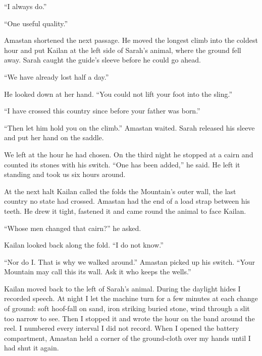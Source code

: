 ``I always do.''\par

``One useful quality.''\par

Amastan shortened the next passage. He moved the longest climb into the coldest hour and put Kailan at the left side of Sarah's animal, where the ground fell away. Sarah caught the guide's sleeve before he could go ahead.\par

``We have already lost half a day.''\par

He looked down at her hand. ``You could not lift your foot into the sling.''\par

``I have crossed this country since before your father was born.''\par

``Then let him hold you on the climb.'' Amastan waited. Sarah released his sleeve and put her hand on the saddle.\par

We left at the hour he had chosen. On the third night he stopped at a cairn and counted its stones with his switch. ``One has been added,'' he said. He left it standing and took us six hours around.\par

At the next halt Kailan called the folds the Mountain's outer wall, the last country no state had crossed. Amastan had the end of a load strap between his teeth. He drew it tight, fastened it and came round the animal to face Kailan.\par

``Whose men changed that cairn?'' he asked.\par

Kailan looked back along the fold. ``I do not know.''\par

``Nor do I. That is why we walked around.'' Amastan picked up his switch. ``Your Mountain may call this its wall. Ask it who keeps the wells.''\par

Kailan moved back to the left of Sarah's animal. During the daylight hides I recorded speech. At night I let the machine turn for a few minutes at each change of ground: soft hoof-fall on sand, iron striking buried stone, wind through a slit too narrow to see. Then I stopped it and wrote the hour on the band around the reel. I numbered every interval I did not record. When I opened the battery compartment, Amastan held a corner of the ground-cloth over my hands until I had shut it again.\par

